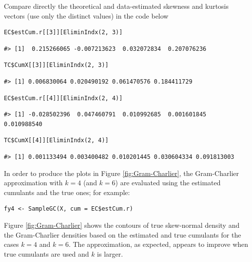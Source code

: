 Compare directly the theoretical and data-estimated skewness and kurtosis vectors (use only the distinct values) in the code below

\begin{verbatim}
EC$estCum.r[[3]][EliminIndx(2, 3)]
\end{verbatim}

\begin{verbatim}
#> [1]  0.215266065 -0.007213623  0.032072834  0.207076236
\end{verbatim}

\begin{verbatim}
TC$CumX[[3]][EliminIndx(2, 3)]
\end{verbatim}

\begin{verbatim}
#> [1] 0.006830064 0.020490192 0.061470576 0.184411729
\end{verbatim}

\begin{verbatim}
EC$estCum.r[[4]][EliminIndx(2, 4)]
\end{verbatim}

\begin{verbatim}
#> [1] -0.028502396  0.047460791  0.010992685  0.001601845  0.010988540
\end{verbatim}

\begin{verbatim}
TC$CumX[[4]][EliminIndx(2, 4)]
\end{verbatim}

\begin{verbatim}
#> [1] 0.001133494 0.003400482 0.010201445 0.030604334 0.091813003
\end{verbatim}

In order to produce the plots in Figure \ref{fig:Gram-Charlier}, the Gram-Charlier approximation with \(k=4\) (and \(k=6\)) are evaluated using the estimated cumulants and the true ones; for example:

\begin{verbatim}
fy4 <- SampleGC(X, cum = EC$estCum.r)
\end{verbatim}

Figure \ref{fig:Gram-Charlier} shows the contours of true skew-normal density and the Gram-Charlier densities based on the estimated and true cumulants for the cases \(k=4\) and \(k=6\). The approximation, as expected, appears to improve when true cumulants are used and \(k\) is larger.

